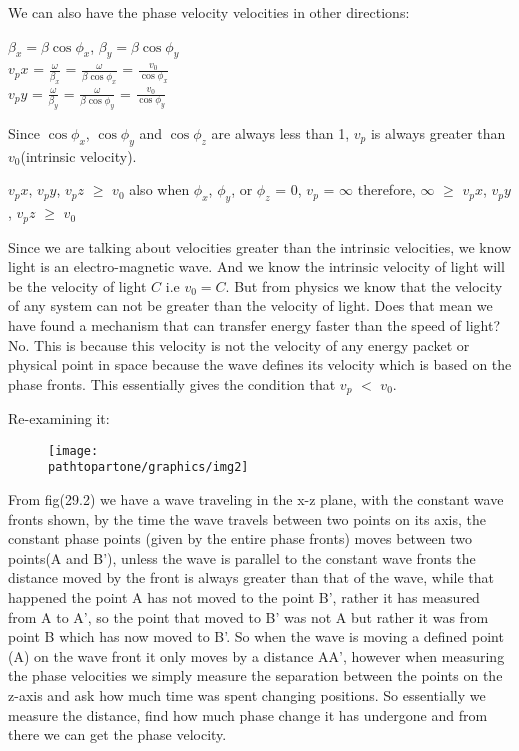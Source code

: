 We can also have the phase velocity velocities in other directions:
\begin{center}
$\beta_x = \beta\cos\phi_{x}$, $\beta_y = \beta\cos\phi_{y}$\\
$v_px$ = $\frac{\omega}{\beta_x}$ = $\frac{\omega}{\beta\cos\phi_{x}}$ = $\frac{v_0}{\cos\phi_{x}}$\\
$v_py$ = $\frac{\omega}{\beta_y}$ = $\frac{\omega}{\beta\cos\phi_{y}}$ = $\frac{v_0}{\cos\phi_{y}}$
\end{center}
Since $\cos\phi_{x}$, $\cos\phi_{y}$ and $\cos\phi_{z}$ are always less than 1, $v_p$ is always greater than $v_0$(intrinsic velocity).
\begin{center}
$v_px$, $v_py$, $v_pz$ $\geq$ $v_0$
also when $\phi_{x}$, $\phi_{y}$, or $\phi_{z}$ = 0, $v_p$ = $\infty$
therefore, $\infty$ $\geq$ $v_px$, $v_py$, $v_pz$ $\geq$ $v_0$
\end{center}
Since we are talking about velocities greater than the intrinsic velocities, we know light is an electro-magnetic wave. And we know the intrinsic velocity of light will be the velocity of light $C$ i.e $v_0 = C$.
But from physics we know that the velocity of any system can not be greater than the velocity of light.
Does that mean we have found a mechanism that can transfer energy faster than the speed of light?
No. This is because this velocity is not the velocity of any energy packet or physical point in space because the wave defines its velocity which is based on the phase fronts. This essentially gives the condition that $v_p$ $<$ $v_0$.

Re-examining it:
\begin{figure}[h]
\centering
\texttt{[image: \\pathtopartone/graphics/img2]}
\caption{}
\end{figure}

From fig(29.2) we have a wave traveling in the x-z plane, with the constant wave fronts shown, by the time the wave travels between two points on its axis, the constant phase points (given by the entire phase fronts) moves between two points(A and B'), unless the wave is parallel to the constant wave fronts the distance moved by the front is always greater than that of the wave, while that happened the point A has not moved to the point B', rather it has measured from A to A', so the point that moved to B' was not A but rather it was from point B which has now moved to B'. So when the wave is moving a defined point (A) on the wave front it only moves by a distance AA', however when measuring the phase velocities we simply measure the separation between the points on the z-axis and ask how much time was spent changing positions. So essentially we measure the distance, find how much phase change it has undergone and from there we can get the phase velocity.


